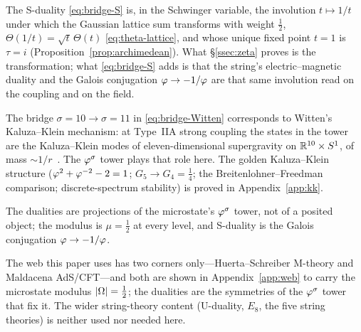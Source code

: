 \begin{remark}\label{rmk:S-is-involution}
The S-duality \eqref{eq:bridge-S} is, in the Schwinger variable, the involution $t\mapsto1/t$ under
which the Gaussian lattice sum transforms with weight $\tfrac12$,
$\Theta(1/t)=\sqrt t\,\Theta(t)$ \eqref{eq:theta-lattice}, and whose unique fixed point $t=1$ is
$\tau=i$ (Proposition~\ref{prop:archimedean}). What \S\ref{ssec:zeta} proves is the transformation;
what \eqref{eq:bridge-S} adds is that the string's electric--magnetic duality and the Galois
conjugation $\varphi\to-1/\varphi$ are that same involution read on the coupling and on the field.

\end{remark}


\begin{remark}
The bridge $\sigma=10\to\sigma=11$ in \eqref{eq:bridge-Witten} corresponds to Witten's Kaluza--Klein
mechanism: at Type~IIA strong coupling the states in the tower are the Kaluza--Klein modes of
eleven-dimensional supergravity on $\mathbb{R}^{10}\times S^1$, of mass $\sim 1/r$~\cite{Witten95}. The
$\varphi^{\sigma}$ tower plays that role here. The golden Kaluza--Klein structure
($\varphi^2+\varphi^{-2}-2=1$; $G_5\to G_4=\tfrac14$; the Breitenlohner--Freedman comparison;
discrete-spectrum stability) is proved in Appendix~\ref{app:kk}.
\end{remark}

\begin{remark}
The dualities are projections of the microstate's $\varphi^{\sigma}$ tower, not of a posited object;
the modulus is $\mu=\tfrac12$ at every level, and S-duality is the Galois conjugation
$\varphi\to-1/\varphi$.
\end{remark}

\begin{remark}
The web this paper uses has two corners only---Huerta--Schreiber M-theory and Maldacena AdS/CFT---and both
are shown in Appendix~\ref{app:web} to carry the microstate modulus $|\Omega|=\tfrac12$; the dualities are the
symmetries of the $\varphi^{\sigma}$ tower that fix it. The wider string-theory content (U-duality, $E_8$, the
five string theories) is neither used nor needed here.
\end{remark}

